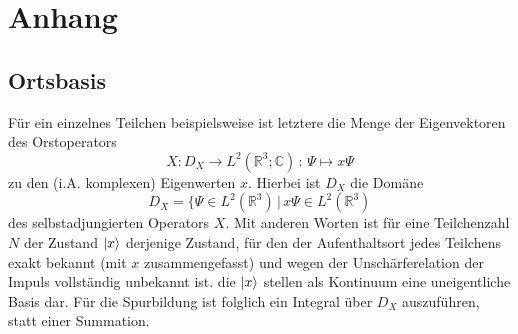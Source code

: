 % 
% 
% 
% 

\chapter{Anhang}
\section{Ortsbasis}
\label{sec:A_1}
Für ein einzelnes Teilchen beispielsweise ist letztere die Menge der Eigenvektoren des Orstoperators
\begin{equation*}
  X:D_X \rightarrow L^2(\mathbb{R}^3;\mathbb{C}) \, : \, \Psi \mapsto x\Psi
\end{equation*}
zu den (i.A. komplexen) Eigenwerten $x$. Hierbei ist $D_X$ die Domäne
\begin{equation*}
  D_X = \{\Psi \in L^2(\mathbb{R}^3) \, | \, x\Psi \in L^2(\mathbb{R}^3)
\end{equation*}
des selbstadjungierten Operators $X$. Mit anderen Worten ist für eine Teilchenzahl $N$ der Zustand $\ket{x}$ derjenige Zustand, für den der Aufenthaltsort jedes Teilchens exakt bekannt (mit $x$ zusammengefasst) und wegen der Unschärferelation der Impuls vollständig unbekannt ist.
die $\ket{x}$ stellen als Kontinuum eine uneigentliche Basis dar. Für die Spurbildung ist folglich ein Integral über $D_X$ auszuführen, statt einer Summation.

